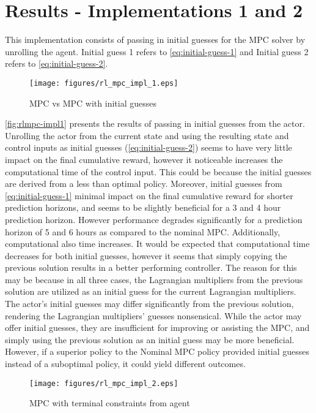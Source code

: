 \section{Results - Implementations 1 and 2}
This implementation consists of passing in initial guesses for the MPC solver by unrolling the agent. Initial guess 1 refers to \autoref{eq:initial-guess-1} and Initial guess 2 refers to \autoref{eq:initial-guess-2}.
\begin{figure}[H]
	\centering
	\texttt{[image: figures/rl\_mpc\_impl\_1.eps]}
	\caption{MPC vs MPC with initial guesses}
	\label{fig:rlmpc-impl1}
\end{figure}
\autoref{fig:rlmpc-impl1} presents the results of passing in initial guesses from the actor. Unrolling the actor from the current state and using the resulting state and control inputs as initial guesses (\autoref{eq:initial-guess-2}) seems to have very little impact on the final cumulative reward, however it noticeable increases the computational time of the control input. This could be because the initial guesses are derived from a less than optimal policy. Moreover, initial guesses from \autoref{eq:initial-guess-1} minimal impact on the final cumulative reward for shorter prediction horizons, and seems to be slightly beneficial for a 3 and 4 hour prediction horizon. However performance degrades significantly for a prediction horizon of 5 and 6 hours as compared to the nominal MPC. Additionally, computational also time increases. It would be expected that computational time decreases for both initial guesses, however it seems that simply copying the previous solution results in a better performing controller. The reason for this may be because in all three cases, the Lagrangian multipliers from the previous solution are utilized as an initial guess for the current Lagrangian multipliers. The actor's initial guesses may differ significantly from the previous solution, rendering the Lagrangian multipliers' guesses nonsensical. While the actor may offer initial guesses, they are insufficient for improving or assisting the MPC, and simply using the previous solution as an initial guess may be more beneficial. However, if a superior policy to the Nominal MPC policy provided initial guesses instead of a suboptimal policy, it could yield different outcomes.


\begin{figure}[H]
	\centering
	\texttt{[image: figures/rl\_mpc\_impl\_2.eps]}
	\caption{MPC with terminal constraints from agent}
	\label{fig:rlmpc-impl2}
\end{figure}

